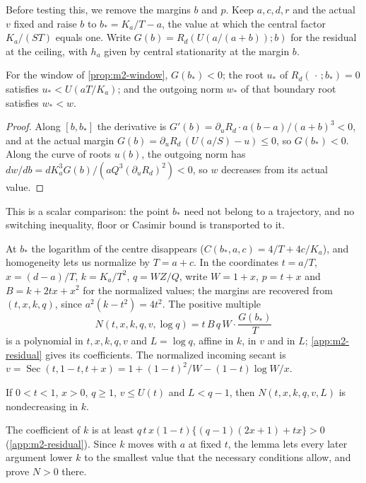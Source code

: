 Before testing this, we remove the margins $b$ and $p$. Keep $a,c,d,r$ and the actual $v$ fixed and
raise $b$ to $b_*=K_a/T-a$, the value at which the central factor $K_a/(ST)$ equals one. Write
$G(b)=R_d(U(a/(a+b));b)$ for the residual at the ceiling, with $h_a$ given by central stationarity at
the margin $b$.

\begin{lemma}\label{lem:m2-comparison}
For the window of \cref{prop:m2-window}, $G(b_*)<0$; the root $u_*$ of $R_d(\,\cdot\,;b_*)=0$
satisfies $u_*<U(aT/K_a)$; and the outgoing norm $w_*$ of that boundary root satisfies $w_*<w$.
\end{lemma}

\begin{proof}
Along $[b,b_*]$ the derivative is $G'(b)=\partial_uR_d\cdot a(b-a)/(a+b)^3<0$, and at the actual
margin $G(b)=\partial_uR_d\,(U(a/S)-u)\le0$, so $G(b_*)<0$. Along the curve of roots $u(b)$, the
outgoing norm has $dw/db=dK_a^3G(b)/(aQ^3(\partial_uR_d)^2)<0$, so $w$ decreases from its actual
value.
\end{proof}

This is a scalar comparison: the point $b_*$ need not belong to a trajectory, and no switching
inequality, floor or Casimir bound is transported to it.

At $b_*$ the logarithm of the centre disappears ($C(b_*,a,c)=4/T+4c/K_a$), and homogeneity lets us
normalize by $T=a+c$. In the coordinates $t=a/T$, $x=(d-a)/T$, $k=K_a/T^2$, $q=WZ/Q$, write
$W=1+x$, $p=t+x$ and $B=k+2tx+x^2$ for the normalized values; the margins are recovered from
$(t,x,k,q)$, since $a^2(k-t^2)=4t^2$. The positive multiple
\[
N(t,x,k,q,v,\log q)=t\,B\,q\,W\cdot\frac{G(b_*)}{T}
\]
is a polynomial in $t,x,k,q,v$ and $L=\log q$, affine in $k$, in $v$ and in $L$; \cref{app:m2-residual} gives its coefficients. The normalized
incoming secant is $v=\operatorname{Sec}(t,1-t,t+x)=1+(1-t)^2/W-(1-t)\log W/x$.

\begin{lemma}\label{lem:m2-shape}
If $0<t<1$, $x>0$, $q\ge1$, $v\le U(t)$ and $L<q-1$, then $N(t,x,k,q,v,L)$ is nondecreasing in $k$.
\end{lemma}

The coefficient of $k$ is at least $q\,t\,x(1-t)\{(q-1)(2x+1)+tx\}>0$ (\cref{app:m2-residual}).
Since $k$ moves with $a$ at fixed $t$, the lemma lets every later argument lower $k$ to the smallest
value that the necessary conditions allow, and prove $N>0$ there.

